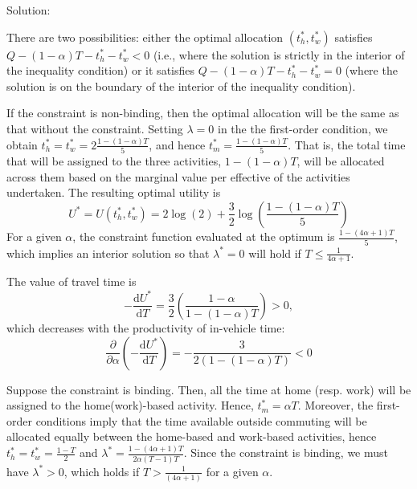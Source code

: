\documentclass[12pt,a4paper,british]{article}
\begin{document}
Solution:

There are two possibilities: either the optimal allocation $\left(t_h^{\ast}, t_w^{\ast}\right)$ satisfies $Q-(1-\alpha)T - t_h^{\ast} - t_w^{\ast} < 0$ (i.e., where the solution is strictly in the interior of the inequality condition) or it satisfies $Q-(1-\alpha)T - t_h^{\ast} - t_w^{\ast} = 0$ (where the solution is on the boundary of the interior of the inequality condition).


\begin{casenv}
	\item If the constraint is non-binding, then the optimal allocation will be the same as that without the constraint. Setting $\lambda=0$ in the the first-order condition, we obtain $t_{h}^{\ast}=t_{w}^{\ast}=2\frac{1-\left(1-\alpha\right)T}{5}$, and hence $t_{m}^{\ast}= \frac{1-\left(1-\alpha\right)T} {5}$. That is, the total time that will be assigned to the three activities, $1-(1-\alpha)T$, will be allocated across them based on the marginal value per effective of the activities undertaken. The resulting optimal utility is
	\begin{equation*}
	U^{\ast} = U \left(t_h^{\ast}, t_w^{\ast}\right) = 2\log (2) +  \frac{3}{2}\log\left(\frac{1-\left(1-\alpha\right)T}{5}\right)
	\end{equation*}
	For a given $ \alpha $, the constraint function evaluated at the optimum is $\frac{1-(4\alpha + 1)T}{5}$, which implies an interior solution so that $\lambda^{\ast}=0$ will hold if $T \leq \frac{1}{4\alpha + 1}$.

	The value of travel time is
	\begin{equation*}
	- \frac{\mathrm{d}U^{\ast}}{\mathrm{d}T} = \frac{3}{2} \left( \frac{1-\alpha}{1-\left(1-\alpha\right)T} \right) > 0,
	\end{equation*}
	which decreases with the productivity of in-vehicle time:
	\begin{equation*}
		\frac{\partial}{\partial\alpha}\left(-\frac{\mathrm{d}U^{\ast}}{\mathrm{d}T}\right)=-\frac{3}{2\left(1-\left(1-\alpha\right)T\right)} < 0
	\end{equation*}

	\item Suppose the constraint is binding. Then, all the time at home (resp. work) will be assigned to the home(work)-based activity. Hence, $t_{m}^{\ast}=\alpha T$. Moreover, the first-order conditions imply that the time available outside commuting will be allocated equally between the home-based and work-based activities, hence $t_{h}^{\ast}=t_{w}^{\ast}=\frac{1-T}{2}$ and $\lambda^{\ast} = \frac{1-\left(4\alpha+1\right)T} {2 \alpha\left( T - 1 \right)T}$. Since the constraint is binding, we must have $\lambda^{\ast}>0$, which holds if $T>\frac{1}{\left(4\alpha+1\right)}$ for a given $\alpha$.

\end{casenv}
\end{document}
